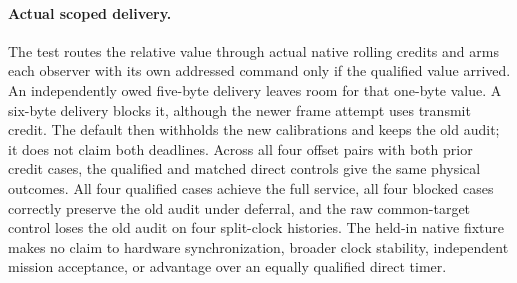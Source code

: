 \documentclass{article}
\begin{document}
\paragraph{Actual scoped delivery.}
The test routes the relative value through actual native
rolling credits and arms each observer with its own addressed
command only if the qualified value arrived. An independently
owed five-byte delivery leaves room for that one-byte value.
A six-byte delivery blocks it, although the newer frame
attempt uses transmit credit. The default then withholds the
new calibrations and keeps the old audit; it does not claim
both deadlines. Across all four offset pairs with both prior
credit cases, the qualified and matched direct controls give
the same physical outcomes. All four qualified cases achieve
the full service, all four blocked cases correctly preserve the
old audit under deferral, and the raw common-target control
loses the old audit on four split-clock histories.
The held-in native fixture makes no claim to hardware
synchronization, broader clock stability, independent mission
acceptance, or advantage over an equally qualified direct timer.
\end{document}
